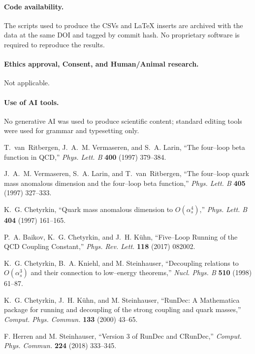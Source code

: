 \documentclass[epjc3]{svjour3}
\begin{document}
\paragraph{Code availability.}
The scripts used to produce the CSVs and \LaTeX{} inserts are archived with the data at the same DOI and tagged by commit hash. No proprietary software is required to reproduce the results.

\paragraph{Ethics approval, Consent, and Human/Animal research.}
Not applicable.

\paragraph{Use of AI tools.}
No generative AI was used to produce scientific content; standard editing tools were used for grammar and typesetting only.


T.~van~Ritbergen, J.~A.~M. Vermaseren, and S.~A. Larin, ``The four–loop beta function in QCD,'' \emph{Phys. Lett. B} \textbf{400} (1997) 379–384.

J.~A.~M. Vermaseren, S.~A. Larin, and T.~van~Ritbergen, ``The four–loop quark mass anomalous dimension and the four–loop beta function,'' \emph{Phys. Lett. B} \textbf{405} (1997) 327–333.

K.~G. Chetyrkin, ``Quark mass anomalous dimension to $O(\alpha_s^4)$,'' \emph{Phys. Lett. B} \textbf{404} (1997) 161–165.

P.~A. Baikov, K.~G. Chetyrkin, and J.~H. Kühn, ``Five–Loop Running of the QCD Coupling Constant,'' \emph{Phys. Rev. Lett.} \textbf{118} (2017) 082002.

K.~G. Chetyrkin, B.~A. Kniehl, and M. Steinhauser, ``Decoupling relations to $O(\alpha_s^3)$ and their connection to low–energy theorems,'' \emph{Nucl. Phys. B} \textbf{510} (1998) 61–87.

K.~G. Chetyrkin, J.~H. Kühn, and M. Steinhauser, ``RunDec: A Mathematica package for running and decoupling of the strong coupling and quark masses,'' \emph{Comput. Phys. Commun.} \textbf{133} (2000) 43–65.

F. Herren and M. Steinhauser, ``Version 3 of RunDec and CRunDec,'' \emph{Comput. Phys. Commun.} \textbf{224} (2018) 333–345.
\end{document}
